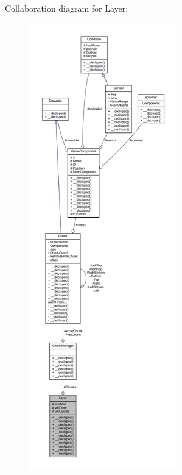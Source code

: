 Collaboration diagram for Layer\-:
\nopagebreak
\begin{figure}[H]
\begin{center}
\leavevmode
\includegraphics[height=550pt]{class_layer__coll__graph}
\end{center}
\end{figure}

